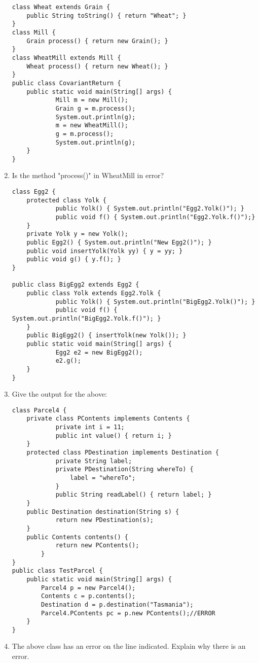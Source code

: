 \documentclass{article}
\begin{document}
\begin{enumerate}
\begin{lstlisting}
class Wheat extends Grain {
  	public String toString() { return "Wheat"; }
}
class Mill {
  	Grain process() { return new Grain(); }
}
class WheatMill extends Mill {
  	Wheat process() { return new Wheat(); }
}
public class CovariantReturn {
  	public static void main(String[] args) {
    		Mill m = new Mill();
    		Grain g = m.process();
    		System.out.println(g);
    		m = new WheatMill();
    		g = m.process();
    		System.out.println(g);
  	}
}
\end{lstlisting}
	\item Is the method "process()" in WheatMill in error?
	\newpage
\begin{lstlisting}
class Egg2 {
  	protected class Yolk {   
    		public Yolk() { System.out.println("Egg2.Yolk()"); }       
    		public void f() { System.out.println("Egg2.Yolk.f()");}
  	}
  	private Yolk y = new Yolk();
  	public Egg2() { System.out.println("New Egg2()"); }
  	public void insertYolk(Yolk yy) { y = yy; }
  	public void g() { y.f(); }
} 

public class BigEgg2 extends Egg2 {
  	public class Yolk extends Egg2.Yolk {
    		public Yolk() { System.out.println("BigEgg2.Yolk()"); }
    		public void f() { System.out.println("BigEgg2.Yolk.f()"); }
  	}
  	public BigEgg2() { insertYolk(new Yolk()); }
  	public static void main(String[] args) {
    		Egg2 e2 = new BigEgg2();
    		e2.g();
  	}
}
\end{lstlisting}
	\item Give the output for the above:
	
\begin{lstlisting}
class Parcel4 {
  	private class PContents implements Contents {
    		private int i = 11;
    		public int value() { return i; }
  	}
  	protected class PDestination implements Destination {
    		private String label;
    		private PDestination(String whereTo) {
      			label = "whereTo";
    		}
    		public String readLabel() { return label; }
  	}
  	public Destination destination(String s) {
    		return new PDestination(s);
  	}
  	public Contents contents() {
    		return new PContents();
    	}
}
public class TestParcel {
	public static void main(String[] args) {
		Parcel4 p = new Parcel4();
		Contents c = p.contents();
		Destination d = p.destination("Tasmania");
		Parcel4.PContents pc = p.new PContents();//ERROR
  	}
}
\end{lstlisting}
	\item The above class has an error on the line indicated. Explain why there is an error.
	\newpage
	

\end{enumerate}
\end{document}

